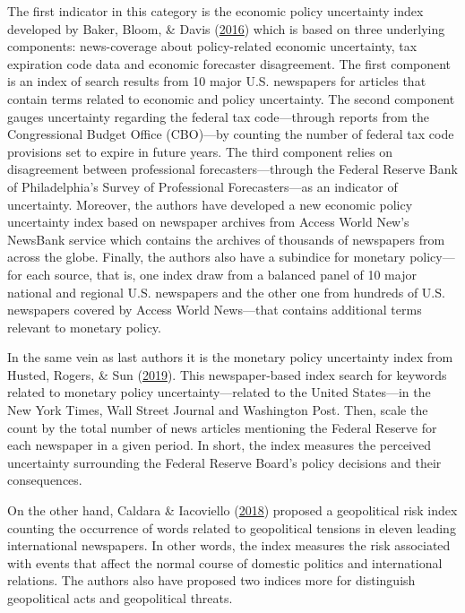 \documentclass[12pt,twoside]{reedthesis}
\begin{document}
The first indicator in this category is the economic policy uncertainty index developed by Baker, Bloom, \& Davis (\protect\hyperlink{ref-bakeetal:2016}{2016}) which is based on three underlying components: news-coverage about policy-related economic uncertainty, tax expiration code data and economic forecaster disagreement. The first component is an index of search results from 10 major U.S. newspapers for articles that contain terms related to economic and policy uncertainty. The second component gauges uncertainty regarding the federal tax code---through reports from the Congressional Budget Office (CBO)---by counting the number of federal tax code provisions set to expire in future years. The third component relies on disagreement between professional forecasters---through the Federal Reserve Bank of Philadelphia's Survey of Professional Forecasters---as an indicator of uncertainty. Moreover, the authors have developed a new economic policy uncertainty index based on newspaper archives from Access World New's NewsBank service which contains the archives of thousands of newspapers from across the globe. Finally, the authors also have a subindice for monetary policy---for each source, that is, one index draw from a balanced panel of 10 major national and regional U.S. newspapers and the other one from hundreds of U.S. newspapers covered by Access World News---that contains additional terms relevant to monetary policy.

In the same vein as last authors it is the monetary policy uncertainty index from Husted, Rogers, \& Sun (\protect\hyperlink{ref-hustetal:2019}{2019}). This newspaper-based index search for keywords related to monetary policy uncertainty---related to the United States---in the New York Times, Wall Street Journal and Washington Post. Then, scale the count by the total number of news articles mentioning the Federal Reserve for each newspaper in a given period. In short, the index measures the perceived uncertainty surrounding the Federal Reserve Board's policy decisions and their consequences.

On the other hand, Caldara \& Iacoviello (\protect\hyperlink{ref-caldiaco:2018}{2018}) proposed a geopolitical risk index counting the occurrence of words related to geopolitical tensions in eleven leading international newspapers. In other words, the index measures the risk associated with events that affect the normal course of domestic politics and international relations. The authors also have proposed two indices more for distinguish geopolitical acts and geopolitical threats.
\end{document}
